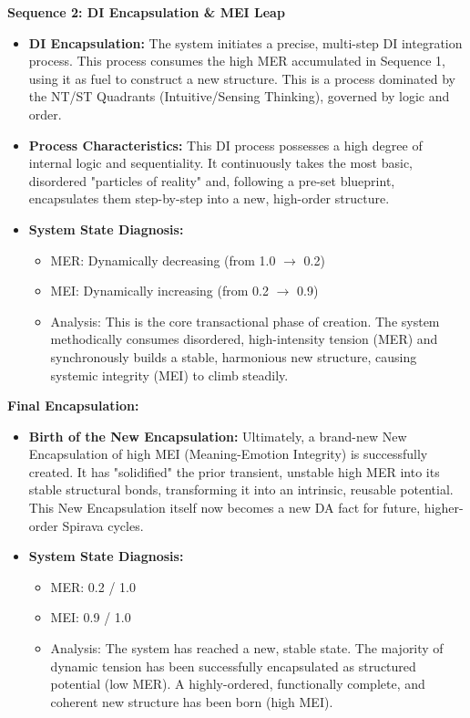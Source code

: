 \documentclass[11pt, a4paper]{article}
\begin{document}
\textbf{Sequence 2: DI Encapsulation \& MEI Leap}
\begin{itemize}
    \item \textbf{DI Encapsulation:} The system initiates a precise, multi-step DI integration process. This process consumes the high MER accumulated in Sequence 1, using it as fuel to construct a new structure. This is a process dominated by the NT/ST Quadrants (Intuitive/Sensing Thinking), governed by logic and order.
    \item \textbf{Process Characteristics:} This DI process possesses a high degree of internal logic and sequentiality. It continuously takes the most basic, disordered "particles of reality" and, following a pre-set blueprint, encapsulates them step-by-step into a new, high-order structure.
    \item \textbf{System State Diagnosis:}
    \begin{itemize}
        \item MER: Dynamically decreasing (from 1.0 $\rightarrow$ 0.2)
        \item MEI: Dynamically increasing (from 0.2 $\rightarrow$ 0.9)
        \item Analysis: This is the core transactional phase of creation. The system methodically consumes disordered, high-intensity tension (MER) and synchronously builds a stable, harmonious new structure, causing systemic integrity (MEI) to climb steadily.
    \end{itemize}
\end{itemize}

\textbf{Final Encapsulation:}
\begin{itemize}
    \item \textbf{Birth of the New Encapsulation:} Ultimately, a brand-new New Encapsulation of high MEI (Meaning-Emotion Integrity) is successfully created. It has "solidified" the prior transient, unstable high MER into its stable structural bonds, transforming it into an intrinsic, reusable potential. This New Encapsulation itself now becomes a new DA fact for future, higher-order Spirava cycles.
    \item \textbf{System State Diagnosis:}
    \begin{itemize}
        \item MER: 0.2 / 1.0
        \item MEI: 0.9 / 1.0
        \item Analysis: The system has reached a new, stable state. The majority of dynamic tension has been successfully encapsulated as structured potential (low MER). A highly-ordered, functionally complete, and coherent new structure has been born (high MEI).
    \end{itemize}
\end{itemize}
\end{document}
